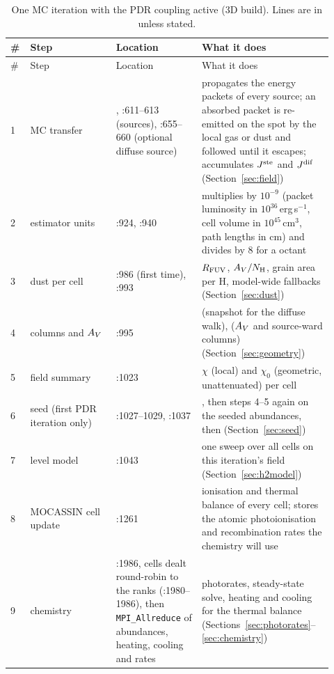 \begin{longtable}{@{}L{0.04\linewidth}L{0.25\linewidth}L{0.25\linewidth}L{0.38\linewidth}@{}}
\caption{One MC iteration with the PDR coupling active (3D build). Lines are in  unless stated.}\label{tab:steps}\\
\toprule
\# & Step & Location & What it does \\
\midrule
\endfirsthead
\toprule
\# & Step & Location & What it does \\
\midrule
{} & MC transfer & , :611--613 (sources), :655--660 (optional diffuse source) & propagates the energy packets of every source; an absorbed packet is re-emitted on the spot by the local gas or dust and followed until it escapes; accumulates $J^{\mathrm{ste}}$ and $J^{\mathrm{dif}}$ (Section~\ref{sec:field}) \\
2 & estimator units & :924, :940 & multiplies by $10^{-9}$ (packet luminosity in $10^{36}$\,erg\,s$^{-1}$, cell volume in $10^{45}$\,cm$^3$, path lengths in cm) and divides by 8 for a  octant \\
3 & dust per cell &  :986 (first time),  :993 & $R_{\mathrm{FUV}}$, $A_{V}/N_{\mathrm H}$, grain area per H, model-wide fallbacks (Section~\ref{sec:dust}) \\
4 & columns and $A_{V}$ &  :995 &  (snapshot for the diffuse walk),  ($A_{V}$ and source-ward columns) (Section~\ref{sec:geometry}) \\
5 & field summary &  :1023 & $\chi$ (local) and $\chi_0$ (geometric, unattenuated) per cell \\
6 & seed (first PDR iteration only) & :1027--1029, :1037 & , then steps 4--5 again on the seeded abundances, then  (Section~\ref{sec:seed}) \\
7 & \Htwo{} level model &  :1043 & one sweep over all cells on this iteration's field (Section~\ref{sec:h2model}) \\
8 & MOCASSIN cell update &  :1261 & ionisation and thermal balance of every cell; stores the atomic photoionisation and recombination rates the chemistry will use \\
9 & chemistry &  :1986, cells dealt round-robin to the ranks (:1980--1986), then \verb|MPI_Allreduce| of abundances, heating, cooling and rates & photorates, steady-state solve, heating and cooling for the thermal balance (Sections~\ref{sec:photorates}--\ref{sec:chemistry}) \\

\end{longtable}
